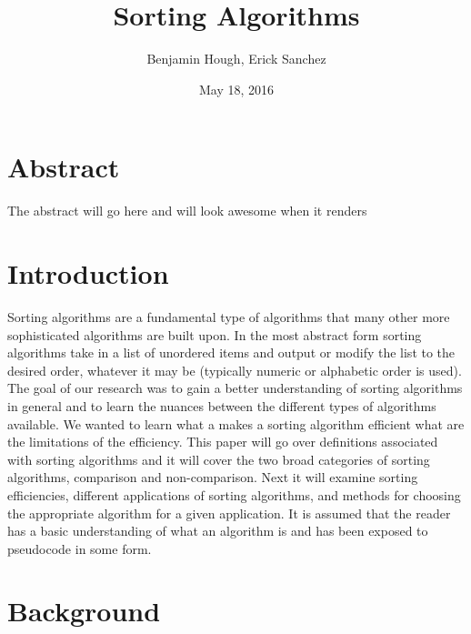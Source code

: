 \documentclass[12pt]{article}
\title{\bfseries Sorting Algorithms}
\author{Benjamin Hough, Erick Sanchez}
\date{May 18, 2016}
\begin{document}
	
	\maketitle
	
	\section*{Abstract}
	
	The abstract will go here and will look awesome when it renders
	
	\tableofcontents
	
	\pagebreak
	
	
	
	\section{Introduction} %
	
	 Sorting algorithms are a fundamental type of algorithms that many other more sophisticated algorithms are built upon.
	 In the most abstract form sorting algorithms take in a list of unordered items and output or modify the list to the desired order, whatever it may be (typically numeric or alphabetic order is used).
	 The goal of our research was to gain a better understanding of sorting algorithms in general  and to learn the nuances between the different types of algorithms available. 
	 We wanted to learn what a makes a sorting algorithm efficient what are the limitations of the efficiency. 
	 This paper will go over definitions associated with sorting algorithms and it will cover the two broad categories of sorting algorithms, comparison and non-comparison. 
	 Next it will examine sorting efficiencies, different applications of sorting algorithms, and methods for choosing the appropriate algorithm for a given application. 
	 It is assumed that the reader has a basic understanding of what an algorithm is and has been exposed to pseudocode in some form. 
	
	\section{Background} %
	
\end{document}
